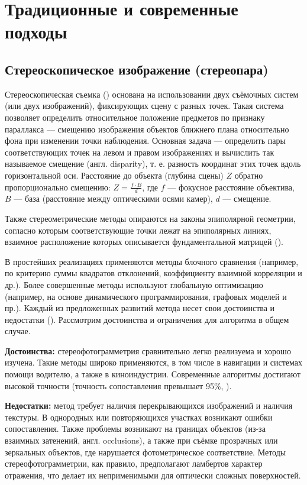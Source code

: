 \section{Традиционные и современные подходы}

\subsection{Стереоскопическое изображение (стереопара)}

Стереоскопическая съемка (\cite{ussr1981phototech}) основана на использовании
двух съёмочных систем (или двух изображений), фиксирующих сцену с разных точек.
Такая система позволяет определить относительное положение предметов по признаку
параллакса — смещению изображения объектов ближнего плана относительно фона при
изменении точки наблюдения.  Основная задача — определить пары соответствующих
точек на левом и правом изображениях и вычислить так называемое смещение (англ.
disparity), т. е.  разность координат этих точек вдоль горизонтальной оси.
Расстояние до объекта (глубина сцены) $Z$ обратно пропорционально смещению: $Z =
\frac{f \cdot B}{d}$, где $f$ — фокусное расстояние объектива, $B$ — база
(расстояние между оптическими осями камер), $d$ — смещение.

Также стереометрические методы опираются на законы эпиполярной геометрии,
согласно которым соответствующие точки лежат на эпиполярных линиях, взаимное
расположение которых описывается фундаментальной матрицей (\cite{Hartley:2003:MVG:861369}).

В простейших реализациях применяются методы блочного сравнения (например, по
критерию суммы квадратов отклонений, коэффициенту взаимной корреляции и др.).
Более совершенные методы используют глобальную оптимизацию (например, на основе
динамического программирования, графовых моделей и пр.). Каждый из предложенных
развитий метода несет свои достоинства и недостатки
(\cite{kok2019reviewonsterevision}). Рассмотрим достоинства и ограничения
для алгоритма в общем случае.

\textbf{Достоинства:} стереофотограмметрия сравнительно легко реализуема и
хорошо изучена. Такие методы широко применяются, в том числе в навигации и
системах помощи водителю, а также в киноиндустрии. Современные алгоритмы
достигают высокой точности (точность сопоставления превышает 95\%,
\cite{fsian2022comparisonstereomatchingalgorithms}).

\textbf{Недостатки:} метод требует наличия перекрывающихся изображений и
наличия текстуры. В однородных или повторяющихся участках возникают ошибки
сопоставления. Также проблемы возникают на границах объектов (из-за взаимных
затенений, англ. occlusions), а также при съёмке прозрачных или зеркальных
объектов, где нарушается фотометрическое соответствие. Методы
стереофотограмметрии, как правило, предполагают ламбертов характер отражения,
что делает их неприменимыми для оптически сложных поверхностей.

